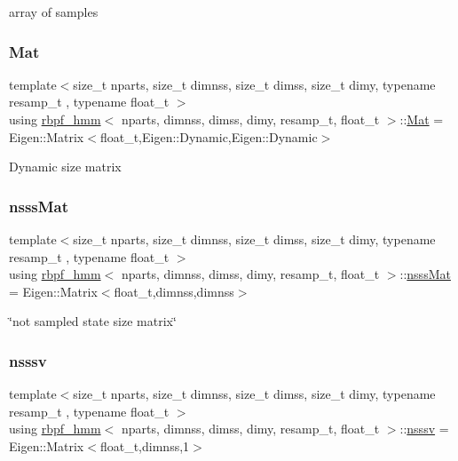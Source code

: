 array of samples \mbox{\label{classrbpf__hmm_ac32aaf9833767d6886f732243a77aa66}} 
\subsubsection{\texorpdfstring{Mat}{Mat}}
{\footnotesize\ttfamily template$<$size\+\_\+t nparts, size\+\_\+t dimnss, size\+\_\+t dimss, size\+\_\+t dimy, typename resamp\+\_\+t , typename float\+\_\+t $>$ \\
using \hyperlink{classrbpf__hmm}{rbpf\+\_\+hmm}$<$ nparts, dimnss, dimss, dimy, resamp\+\_\+t, float\+\_\+t $>$\+::\hyperlink{classrbpf__hmm_ac32aaf9833767d6886f732243a77aa66}{Mat} =  Eigen\+::\+Matrix$<$float\+\_\+t,Eigen\+::\+Dynamic,Eigen\+::\+Dynamic$>$}

Dynamic size matrix \mbox{\label{classrbpf__hmm_a7ae942768da71581665168d3c3063c3f}} 
\subsubsection{\texorpdfstring{nsss\+Mat}{nsssMat}}
{\footnotesize\ttfamily template$<$size\+\_\+t nparts, size\+\_\+t dimnss, size\+\_\+t dimss, size\+\_\+t dimy, typename resamp\+\_\+t , typename float\+\_\+t $>$ \\
using \hyperlink{classrbpf__hmm}{rbpf\+\_\+hmm}$<$ nparts, dimnss, dimss, dimy, resamp\+\_\+t, float\+\_\+t $>$\+::\hyperlink{classrbpf__hmm_a7ae942768da71581665168d3c3063c3f}{nsss\+Mat} =  Eigen\+::\+Matrix$<$float\+\_\+t,dimnss,dimnss$>$}

\char`\"{}not sampled state size matrix\char`\"{} \mbox{\label{classrbpf__hmm_a7988465662f94f2ba45fd22566828d0f}} 
\subsubsection{\texorpdfstring{nsssv}{nsssv}}
{\footnotesize\ttfamily template$<$size\+\_\+t nparts, size\+\_\+t dimnss, size\+\_\+t dimss, size\+\_\+t dimy, typename resamp\+\_\+t , typename float\+\_\+t $>$ \\
using \hyperlink{classrbpf__hmm}{rbpf\+\_\+hmm}$<$ nparts, dimnss, dimss, dimy, resamp\+\_\+t, float\+\_\+t $>$\+::\hyperlink{classrbpf__hmm_a7988465662f94f2ba45fd22566828d0f}{nsssv} =  Eigen\+::\+Matrix$<$float\+\_\+t,dimnss,1$>$}

